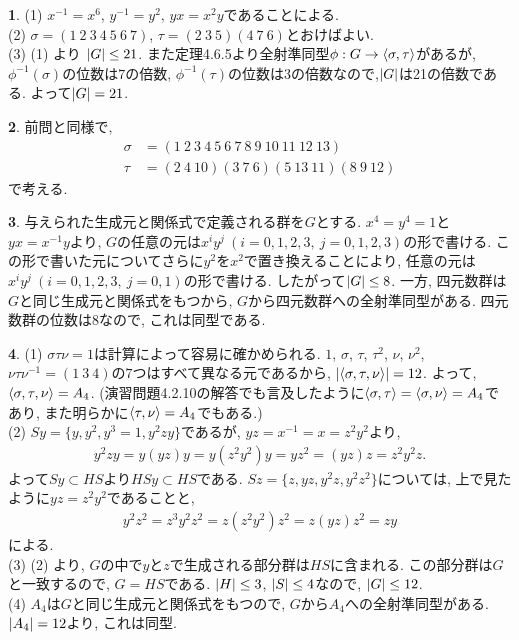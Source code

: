 \documentclass{article}
\theoremstyle{definition}
\newtheorem{ans}{}
\numberwithin{ans}{subsection}
\DeclarePairedDelimiter{\gen}{\langle}{\rangle}
\DeclarePairedDelimiter{\order}{\lvert}{\rvert}
\begin{document}
\begin{ans}
  (1) $x^{-1} = x^6$, $y^{-1} = y^2$, $yx = x^2y$であることによる.\\
  (2) $\sigma = (1\ 2\ 3\ 4\ 5\ 6\ 7)$, $\tau = (2\ 3\ 5)(4\ 7\ 6)$とおけばよい.\\
  (3) (1) より $\order{G} \le 21$. また定理4.6.5より全射準同型$\phi: G \rightarrow \gen{\sigma, \tau}$があるが,
  $\phi^{-1}(\sigma)$の位数は$7$の倍数, $\phi^{-1}(\tau)$の位数は$3$の倍数なので,$\order{G}$は21の倍数である.
  よって$\order{G} = 21$.
\end{ans}

\begin{ans}
  前問と同様で,
  \begin{align*}
    \sigma &= (1\ 2\ 3\ 4\ 5\ 6\ 7\ 8\ 9\ 10\ 11\ 12\ 13) \\
    \tau &= (2\ 4\ 10)(3\ 7\ 6)(5\ 13\ 11)(8\ 9\ 12)
  \end{align*}
  で考える.
\end{ans}

\begin{ans}
  与えられた生成元と関係式で定義される群を$G$とする.
  $x^4 = y^4 = 1$と$yx = x^{-1}y$より,
  $G$の任意の元は$x^iy^j\ (i = 0, 1, 2, 3,\ j = 0, 1, 2, 3)$の形で書ける.
  この形で書いた元についてさらに$y^2$を$x^2$で置き換えることにより,
  任意の元は$x^iy^j\ (i = 0, 1, 2, 3,\ j = 0, 1)$の形で書ける.
  したがって$\order{G} \le 8$.
  一方, 四元数群は$G$と同じ生成元と関係式をもつから, $G$から四元数群への全射準同型がある.
  四元数群の位数は$8$なので, これは同型である.
\end{ans}

\begin{ans}
  (1) $\sigma\tau\nu = 1$は計算によって容易に確かめられる.
  $1$, $\sigma$, $\tau$, $\tau^2$, $\nu$, $\nu^2$, $\nu\tau\nu^{-1} = (1\ 3\ 4)$の$7$つはすべて異なる元であるから,
  $\order{\gen{\sigma, \tau, \nu}} = 12$. よって, $\gen{\sigma, \tau, \nu} = A_4$.
  (演習問題4.2.10の解答でも言及したように$\gen{\sigma, \tau} = \gen{\sigma, \nu} = A_4$であり,
  また明らかに$\gen{\tau, \nu} = A_4$でもある.)\\
  (2) $Sy = \{ y, y^2, y^3 = 1, y^2zy \}$であるが,
  $yz = x^{-1} = x =  z^2y^2$より,
  \begin{align*}
    y^2zy = y(yz)y = y(z^2y^2)y = yz^2 = (yz)z = z^2y^2z.
  \end{align*}
  よって$Sy \subset HS$より$HSy \subset HS$である. $Sz = \{ z, yz, y^2z, y^2z^2 \}$については,
  上で見たように$yz = z^2y^2$であることと,
  \begin{align*}
    y^2z^2 = z^3y^2z^2 = z(z^2y^2)z^2 = z(yz)z^2 = zy
  \end{align*}
  による.\\
  (3) (2) より, $G$の中で$y$と$z$で生成される部分群は$HS$に含まれる.
  この部分群は$G$と一致するので, $G = HS$である.
  $\order{H} \le 3$, $\order{S} \le 4$なので, $\order{G} \le 12$.\\
  (4) $A_4$は$G$と同じ生成元と関係式をもつので, $G$から$A_4$への全射準同型がある.
  $\order{A_4} = 12$より, これは同型.
\end{ans}
\end{document}
